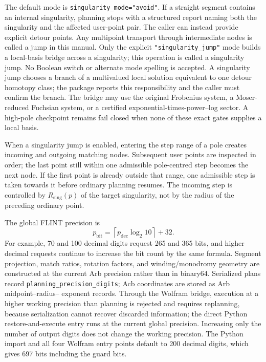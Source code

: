 \documentclass[11pt]{article}
\begin{document}
The default mode is \texttt{singularity\_mode="avoid"}.  If a straight segment contains
an internal singularity, planning stops with a structured report naming both the singularity
and the affected user-point pair.  The caller can instead provide explicit detour points.
Any multipoint transport through intermediate nodes is called a jump in this manual.  Only
the explicit \texttt{"singularity\_jump"} mode builds a local-basis bridge across a
singularity; this operation is called a singularity jump.  No Boolean switch or alternate
mode spelling is accepted.  A singularity jump
chooses a branch of a multivalued local solution equivalent to one detour homotopy class;
the package reports this responsibility and the caller must confirm the branch.  The bridge
may use the original Frobenius system, a
Moser-reduced Fuchsian system, or a certified exponential-times-power--log sector.  A
high-pole checkpoint remains fail closed when none of these exact gates supplies a local
basis.

When a singularity jump is enabled, entering the step range of a pole creates incoming and outgoing
matching nodes.  Subsequent user points are inspected in order; the last point still within
one admissible pole-centred step becomes the next node.  If the first point is already
outside that range, one admissible step is taken towards it before ordinary planning resumes.
The incoming step is controlled by $R_{\mathrm{sing}}(p)$ of the target singularity, not by
the radius of the preceding ordinary point.

The global FLINT precision is
\begin{equation}
 p_{\mathrm{bit}}=\left\lceil p_{\mathrm{dec}}\log_2 10\right\rceil+32.
\end{equation}
For example, 70 and 100 decimal digits request 265 and 365 bits, and higher decimal requests
continue to increase the bit count by the same formula.  Segment projection, match ratios,
rotation factors, and winding/monodromy geometry are constructed at the current Arb
precision rather than in binary64.  Serialized plans record
\texttt{planning\_precision\_digits}; Acb coordinates are stored as Arb midpoint--radius--
exponent records.  Through the Wolfram bridge, execution at a higher working precision than
planning is rejected and requires replanning, because serialization cannot recover discarded
information; the direct Python restore-and-execute entry runs at the current global
precision.  Increasing
only the number of output digits does not change the working precision.
The Python import and all four Wolfram entry points default to 200 decimal digits, which gives
697 bits including the guard bits.
\end{document}
